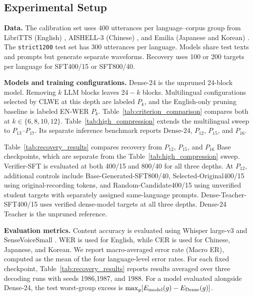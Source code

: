 \documentclass{article}
\begin{document}
\subsection{Experimental Setup}
\label{sec:setup}

\noindent\textbf{Data.}
The calibration set uses 400 utterances per language--corpus group from LibriTTS
(English) \cite{zen2019libritts}, AISHELL-3 (Chinese)
\cite{shi2021aishell3}, and Emilia (Japanese and Korean)
\cite{he2025emilia}. The \texttt{strict1200} test set has 300 utterances
per language. Models share test texts and prompts but generate separate
waveforms. Recovery uses 100 or 200 targets per language for
SFT400/15 or SFT800/40.

\noindent\textbf{Models and training configurations.}
Dense-24 is the unpruned 24-block model. Removing \(k\) LLM blocks
leaves \(24-k\) blocks. Multilingual configurations selected by CLWE
at this depth are labeled \(P_k\), and the English-only pruning
baseline is labeled EN-WER \(P_k\).
Table~\ref{tab:criterion_comparison} compares both at
\(k\in\{6,8,10,12\}\). Table~\ref{tab:high_compression} extends the
multilingual sweep to \(P_{13}\)--\(P_{17}\). Its separate inference
benchmark reports Dense-24, \(P_{12}\), \(P_{15}\), and \(P_{16}\).

Table~\ref{tab:recovery_results} compares recovery from \(P_{12}\),
\(P_{15}\), and \(P_{16}\) Base checkpoints, which are separate from
the Table~\ref{tab:high_compression} sweep. Verifier-SFT
is evaluated at both 400/15 and 800/40 for all three depths. At
\(P_{12}\), additional controls include Base-Generated-SFT800/40,
Selected-Original400/15 using original-recording tokens, and
Random-Candidate400/15 using unverified student targets with
separately assigned same-language prompts. Dense-Teacher-SFT400/15
uses verified dense-model targets at all three depths. Dense-24
Teacher is the unpruned reference.

\noindent\textbf{Evaluation metrics.}
Content accuracy is evaluated using Whisper large-v3
\cite{radford2023whisper} and SenseVoiceSmall
\cite{an2024funaudiollm}. WER is used for English, while CER is used for Chinese,
Japanese, and Korean. We report macro-averaged error rate (Macro ER),
computed as the mean of the four language-level error rates.
For each fixed checkpoint, Table~\ref{tab:recovery_results} reports results averaged over three decoding runs with seeds 1986,1987, and 1988.
For a model
evaluated alongside Dense-24, the test worst-group excess is
$\max_g[E_{\rm model}(g)-E_{\rm Dense}(g)]$.
\end{document}
